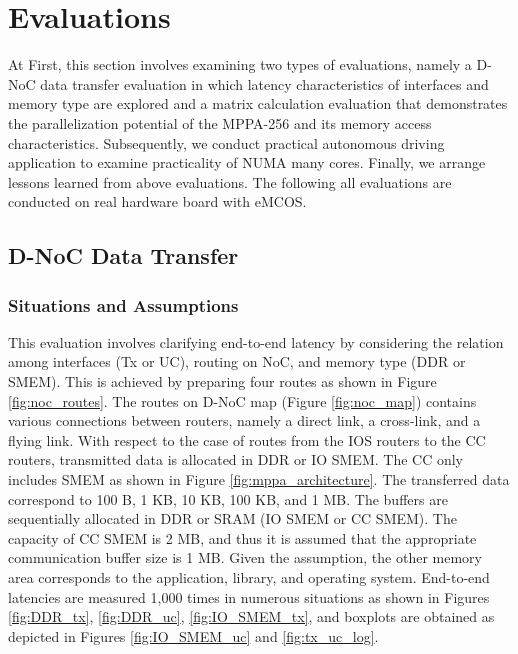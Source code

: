 \documentclass[conference,compsoc]{IEEEtran}
\begin{document}
\vspace{-3mm}
\section{Evaluations}
\label{sec:evaluations}
\vspace{-3mm}
At First, this section involves examining two types of evaluations, namely a D-NoC data transfer evaluation in which latency characteristics of interfaces and memory type are explored and a matrix calculation evaluation that demonstrates the parallelization potential of the MPPA-256 and its memory access characteristics.
Subsequently, we conduct practical autonomous driving application to examine practicality of NUMA many cores.
Finally, we arrange lessons learned from above evaluations.
The following all evaluations are conducted on real hardware board with eMCOS.

\vspace{-3mm}
\subsection{D-NoC Data Transfer}
\label{sec:dnoc_eval}

\vspace{-3mm}
\subsubsection{Situations and Assumptions}
\label{sec:situations_and_assumptions}

This evaluation involves clarifying end-to-end latency by considering the relation among interfaces (Tx or UC), routing on NoC, and memory type (DDR or SMEM).
This is achieved by preparing four routes as shown in Figure \ref{fig:noc_routes}.
The routes on D-NoC map (Figure \ref{fig:noc_map}) contains various connections between routers, namely a direct link, a cross-link, and a flying link.
With respect to the case of routes from the IOS routers to the CC routers, transmitted data is allocated in DDR or IO SMEM.
The CC only includes SMEM as shown in Figure \ref{fig:mppa_architecture}.
The transferred data correspond to 100 B, 1 KB, 10 KB, 100 KB, and 1 MB.
The buffers are sequentially allocated in DDR or SRAM (IO SMEM or CC SMEM).
The capacity of CC SMEM is 2 MB, and thus it is assumed that the appropriate communication buffer size is 1 MB.
Given the assumption, the other memory area corresponds to the application, library, and operating system.
End-to-end latencies are measured 1,000 times in numerous situations as shown in Figures \ref{fig:DDR_tx}, \ref{fig:DDR_uc}, \ref{fig:IO_SMEM_tx}, and boxplots are obtained as depicted in Figures \ref{fig:IO_SMEM_uc} and \ref{fig:tx_uc_log}.
\end{document}
